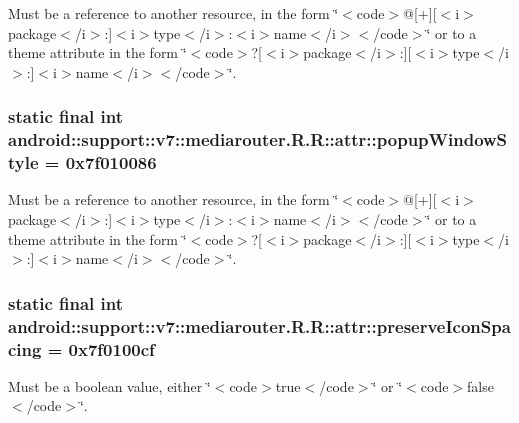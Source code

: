 Must be a reference to another resource, in the form \char`\"{}$<$code$>$@\mbox{[}+\mbox{]}\mbox{[}$<$i$>$package$<$/i$>$:\mbox{]}$<$i$>$type$<$/i$>$:$<$i$>$name$<$/i$>$$<$/code$>$\char`\"{} or to a theme attribute in the form \char`\"{}$<$code$>$?\mbox{[}$<$i$>$package$<$/i$>$:\mbox{]}\mbox{[}$<$i$>$type$<$/i$>$:\mbox{]}$<$i$>$name$<$/i$>$$<$/code$>$\char`\"{}. \hypertarget{classandroid_1_1support_1_1v7_1_1mediarouter_1_1_r_1_1attr_092a5e7aabd689444009471c54772bdc}{
\subsubsection[{popupWindowStyle}]{\setlength{\rightskip}{0pt plus 5cm}static final int android::support::v7::mediarouter.R.R::attr::popupWindowStyle = 0x7f010086}}
\label{classandroid_1_1support_1_1v7_1_1mediarouter_1_1_r_1_1attr_092a5e7aabd689444009471c54772bdc}


Must be a reference to another resource, in the form \char`\"{}$<$code$>$@\mbox{[}+\mbox{]}\mbox{[}$<$i$>$package$<$/i$>$:\mbox{]}$<$i$>$type$<$/i$>$:$<$i$>$name$<$/i$>$$<$/code$>$\char`\"{} or to a theme attribute in the form \char`\"{}$<$code$>$?\mbox{[}$<$i$>$package$<$/i$>$:\mbox{]}\mbox{[}$<$i$>$type$<$/i$>$:\mbox{]}$<$i$>$name$<$/i$>$$<$/code$>$\char`\"{}. \hypertarget{classandroid_1_1support_1_1v7_1_1mediarouter_1_1_r_1_1attr_b267854cb53beac1706a77b766296000}{
\subsubsection[{preserveIconSpacing}]{\setlength{\rightskip}{0pt plus 5cm}static final int android::support::v7::mediarouter.R.R::attr::preserveIconSpacing = 0x7f0100cf}}
\label{classandroid_1_1support_1_1v7_1_1mediarouter_1_1_r_1_1attr_b267854cb53beac1706a77b766296000}


Must be a boolean value, either \char`\"{}$<$code$>$true$<$/code$>$\char`\"{} or \char`\"{}$<$code$>$false$<$/code$>$\char`\"{}. 

